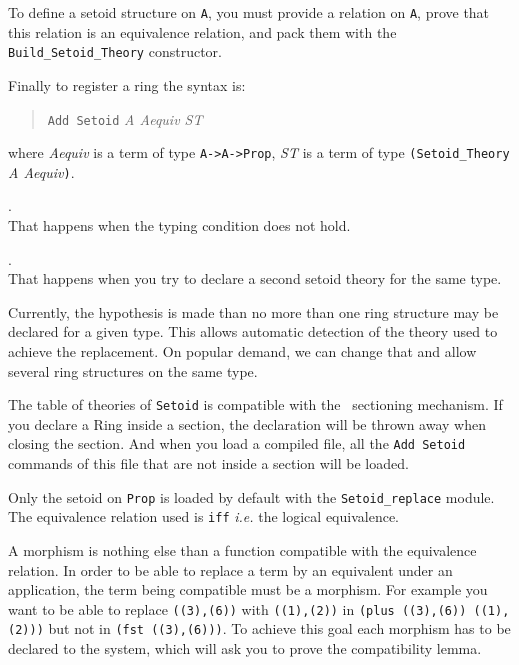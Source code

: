 To define a setoid structure on \verb+A+, you must provide a relation
on \verb+A+, prove that this relation is an equivalence
relation, and pack them with the \verb|Build_Setoid_Theory| 
constructor.

Finally to register a ring the syntax is:

\begin{quotation}
  \texttt{Add Setoid} \textit{ A Aequiv ST}
\end{quotation}

\noindent where \textit{Aequiv} is a term of type \texttt{A->A->Prop},
\textit{ST} is a term of type 
\texttt{(Setoid\_Theory }\textit{A Aequiv}\texttt{)}.

\begin{ErrMsgs}
\item {}.\\ 
  That happens when the typing condition does not hold.
\item {}.\\
  That happens when you try to declare a second setoid theory for the
  same type.
\end{ErrMsgs}

Currently, the hypothesis is made than no more than one ring structure
may be declared for a given type.
This allows automatic detection of the theory used to achieve the
replacement. On popular demand, we can change that and allow several
ring structures on the same type.

The table of theories of \texttt{Setoid} is compatible with the \Coq\ 
sectioning mechanism. If you declare a Ring inside a section, the
declaration will be thrown away when closing the section.
And when you load a compiled file, all the \texttt{Add Setoid}
commands of this file that are not inside a section will be loaded.

\Warning Only the setoid on \texttt{Prop} is loaded by default with the
\texttt{Setoid\_replace} module. The equivalence relation used is
\texttt{iff} {\it i.e.} the logical equivalence.


A morphism is nothing else than a function compatible with the
equivalence relation. 
In order to be able to replace a term by an equivalent under an
application, the term being compatible must be a morphism. For example
you want to be able to replace \verb+((3),(6))+ with \verb+((1),(2))+
in \verb+(plus ((3),(6)) ((1),(2)))+ but not in
\verb+(fst ((3),(6)))+. To achieve this goal each morphism has to be
declared to the system, which will ask you to prove the compatibility
lemma.

